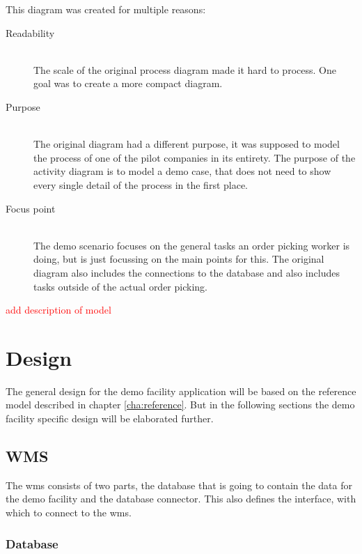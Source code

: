 \clearpage

This diagram was created for multiple reasons:

\begin{description}
	\item[Readability] \hfill \\
	The scale of the original process diagram made it hard to process. One goal was to create a more compact diagram.
	\item[Purpose] \hfill \\
	The original diagram had a different purpose, it was supposed to model the process of one of the pilot companies in its entirety. The purpose of the activity diagram is to model a demo case, that does not need to show every single detail of the process in the first place.
	\item[Focus point] \hfill \\
	The demo scenario focuses on the general tasks an order picking worker is doing, but is just focussing on the main points for this. The original diagram also includes the connections to the database and also includes tasks outside of the actual order picking.
\end{description}

\textcolor{red}{add description of model}

\section{Design}
The general design for the demo facility application will be based on the reference model described in chapter \ref{cha:reference}. But in the following sections the demo facility specific design will be elaborated further.


\subsection{WMS}
The \acrlong{wms} consists of two parts, the database that is going to contain the data for the demo facility and the database connector. This also defines the interface, with which to connect to the \gls{wms}.

\subsubsection{Database}

